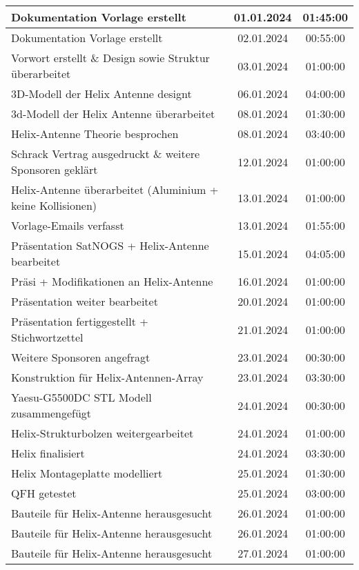 \begin{longtable}{|l|c|c|}
	\hline
	Dokumentation Vorlage erstellt & 01.01.2024 & 01:45:00 \\
	\hline
	Dokumentation Vorlage erstellt & 02.01.2024 & 00:55:00 \\
	\hline
	Vorwort erstellt \& Design sowie Struktur überarbeitet & 03.01.2024 & 01:00:00 \\
	\hline
	3D-Modell der Helix Antenne designt & 06.01.2024 & 04:00:00 \\
	\hline
	3d-Modell der Helix Antenne überarbeitet & 08.01.2024 & 01:30:00 \\
	\hline
	Helix-Antenne Theorie besprochen & 08.01.2024 & 03:40:00 \\
	\hline
	Schrack Vertrag ausgedruckt \& weitere Sponsoren geklärt & 12.01.2024 & 01:00:00 \\
	\hline
	Helix-Antenne überarbeitet (Aluminium + keine Kollisionen) & 13.01.2024 & 01:00:00 \\
	\hline
	Vorlage-Emails verfasst & 13.01.2024 & 01:55:00 \\
	\hline
	Präsentation SatNOGS + Helix-Antenne bearbeitet & 15.01.2024 & 04:05:00 \\
	\hline
	Präsi + Modifikationen an Helix-Antenne & 16.01.2024 & 01:00:00 \\
	\hline
	Präsentation weiter bearbeitet & 20.01.2024 & 01:00:00 \\
	\hline
	Präsentation fertiggestellt + Stichwortzettel & 21.01.2024 & 01:00:00 \\
	\hline
	Weitere Sponsoren angefragt & 23.01.2024 & 00:30:00 \\
	\hline
	Konstruktion für Helix-Antennen-Array & 23.01.2024 & 03:30:00 \\
	\hline
	Yaesu-G5500DC STL Modell zusammengefügt & 24.01.2024 & 00:30:00 \\
	\hline
	Helix-Strukturbolzen weitergearbeitet & 24.01.2024 & 01:00:00 \\
	\hline
	Helix finalisiert & 24.01.2024 & 03:30:00 \\
	\hline
	Helix Montageplatte modelliert & 25.01.2024 & 01:30:00 \\
	\hline
	QFH getestet & 25.01.2024 & 03:00:00 \\
	\hline
	Bauteile für Helix-Antenne herausgesucht & 26.01.2024 & 01:00:00 \\
	\hline
	Bauteile für Helix-Antenne herausgesucht & 26.01.2024 & 01:00:00 \\
	\hline
	Bauteile für Helix-Antenne herausgesucht & 27.01.2024 & 01:00:00 \\

\end{longtable}
